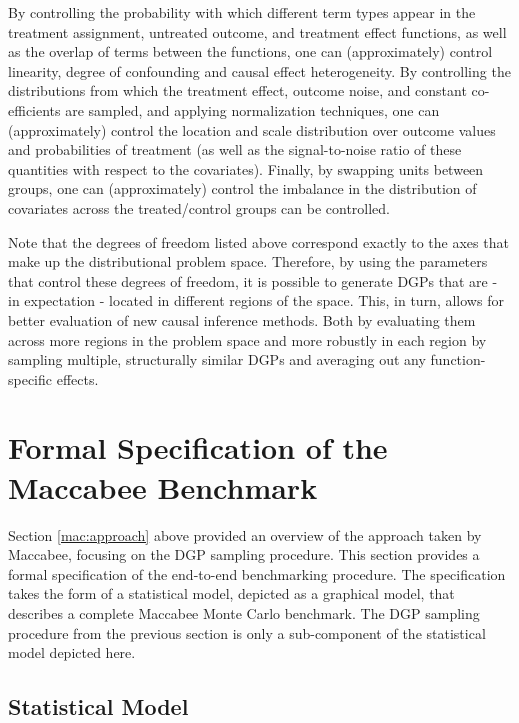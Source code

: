 \documentclass[../main.tex]{subfiles}
\begin{document}
By controlling the probability with which different term types appear in the treatment assignment, untreated outcome, and treatment effect functions, as well as the overlap of terms between the functions, one can (approximately) control linearity, degree of confounding and causal effect heterogeneity. By controlling the distributions from which the treatment effect, outcome noise, and constant co-efficients are sampled, and applying normalization techniques, one can (approximately) control the location and scale distribution over outcome values and probabilities of treatment (as well as the signal-to-noise ratio of these quantities with respect to the covariates). Finally, by swapping units between groups, one can (approximately) control the imbalance in the distribution of covariates across the treated/control groups can be controlled.

\vspace{\baselineskip}

Note that the degrees of freedom listed above correspond exactly to the axes that make up the distributional problem space. Therefore, by using the parameters that control these degrees of freedom, it is possible to generate DGPs that are - in expectation - located in different regions of the space. This, in turn, allows for better evaluation of new causal inference methods. Both by evaluating them across more regions in the problem space and more robustly in each region by sampling multiple, structurally similar DGPs and averaging out any function-specific effects.

\section{Formal Specification of the Maccabee Benchmark}
\label{mac:formalspec}

Section \ref{mac:approach} above provided an overview of the approach taken by Maccabee, focusing on the DGP sampling procedure. This section provides a formal specification of the end-to-end benchmarking procedure. The specification takes the form of a statistical model, depicted as a graphical model, that describes a complete Maccabee Monte Carlo benchmark. The DGP sampling procedure from the previous section is only a sub-component of the statistical model depicted here.

\subsection{Statistical Model}
\end{document}
